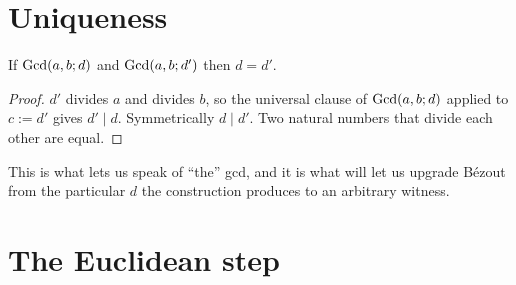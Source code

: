 \section{Uniqueness}

\begin{lemma}
  \leanok
  \label{lem:is_gcd_unique}
  If $\mathrm{Gcd}(a,b;d)$ and $\mathrm{Gcd}(a,b;d')$ then $d = d'$.
\end{lemma}
\begin{proof}
  \leanok
  $d'$ divides $a$ and divides $b$, so the universal clause of $\mathrm{Gcd}(a,b;d)$
  applied to $c := d'$ gives $d' \mid d$. Symmetrically $d \mid d'$. Two natural
  numbers that divide each other are equal.
\end{proof}

This is what lets us speak of ``the'' gcd, and it is what will let us upgrade
B\'ezout from the particular $d$ the construction produces to an arbitrary
witness.

\section{The Euclidean step}

